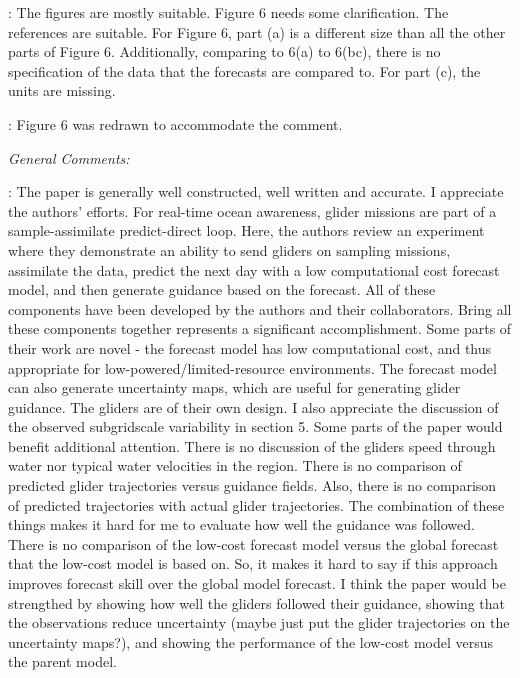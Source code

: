 \documentclass[a4paper]{article}
\begin{document}
\begin{answers}

\item
  \reply: The figures are mostly suitable. Figure 6 needs some
  clarification. The references are suitable. For Figure 6, part (a) is
  a different size than all the other parts of Figure 6. Additionally,
  comparing to 6(a) to 6(bc), there is no specification of the data that
  the forecasts are compared to. For part (c), the units are missing.

  \action: Figure 6 was redrawn to accommodate the comment.

\item {\it General Comments:}\label{sec:r2-genl}

    \reply: The paper is generally well constructed, well written and
    accurate. I appreciate the authors’ efforts. For real-time ocean
    awareness, glider missions are part of a sample-assimilate
    predict-direct loop. Here, the authors review an experiment where
    they demonstrate an ability to send gliders on sampling missions,
    assimilate the data, predict the next day with a low computational
    cost forecast model, and then generate guidance based on the
    forecast. All of these components have been developed by the authors
    and their collaborators. Bring all these components together
    represents a significant accomplishment. Some parts of their work
    are novel - the forecast model has low computational cost, and thus
    appropriate for low-powered/limited-resource environments. The
    forecast model can also generate uncertainty maps, which are useful
    for generating glider guidance. The gliders are of their own design.
    I also appreciate the discussion of the observed subgridscale
    variability in section 5. Some parts of the paper would benefit
    additional attention. There is no discussion of the gliders speed
    through water nor typical water velocities in the region. There is
    no comparison of predicted glider trajectories versus guidance
    fields. Also, there is no comparison of predicted trajectories with
    actual glider trajectories. The combination of these things makes it
    hard for me to evaluate how well the guidance was followed. There is
    no comparison of the low-cost forecast model versus the global
    forecast that the low-cost model is based on. So, it makes it hard
    to say if this approach improves forecast skill over the global
    model forecast. I think the paper would be strengthed by showing how
    well the gliders followed their guidance, showing that the
    observations reduce uncertainty (maybe just put the glider
    trajectories on the uncertainty maps?), and showing the performance
    of the low-cost model versus the parent model.


\end{answers}
\end{document}
